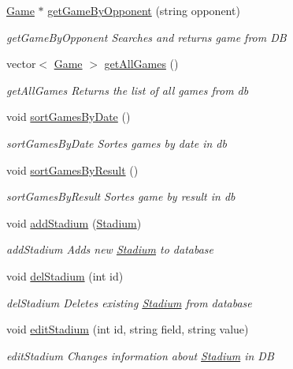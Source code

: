 \begin{DoxyCompactItemize}
\hyperlink{class_game}{Game} $\ast$ \hyperlink{class_data_base_aded9581d3a3a49f2bcef9b85d47df91a}{get\-Game\-By\-Opponent} (string opponent)
\begin{DoxyCompactList}\small\item\em get\-Game\-By\-Opponent Searches and returns game from D\-B \end{DoxyCompactList}\item 
vector$<$ \hyperlink{class_game}{Game} $>$ \hyperlink{class_data_base_aefef256aaad12ee1be50641880fe02f3}{get\-All\-Games} ()
\begin{DoxyCompactList}\small\item\em get\-All\-Games Returns the list of all games from db \end{DoxyCompactList}\item 
void \hyperlink{class_data_base_af298db6d84a93e352aa9915dfbaefd4a}{sort\-Games\-By\-Date} ()
\begin{DoxyCompactList}\small\item\em sort\-Games\-By\-Date Sortes games by date in db \end{DoxyCompactList}\item 
void \hyperlink{class_data_base_a7ded6aadeece170243c9c65cc976704e}{sort\-Games\-By\-Result} ()
\begin{DoxyCompactList}\small\item\em sort\-Games\-By\-Result Sortes game by result in db \end{DoxyCompactList}\item 
void \hyperlink{class_data_base_ab647a42c48cbaaa71446c4c6359c2594}{add\-Stadium} (\hyperlink{class_stadium}{Stadium})
\begin{DoxyCompactList}\small\item\em add\-Stadium Adds new \hyperlink{class_stadium}{Stadium} to database \end{DoxyCompactList}\item 
void \hyperlink{class_data_base_a169759f8c5addb82ce8fbf5c33cfe4ac}{del\-Stadium} (int id)
\begin{DoxyCompactList}\small\item\em del\-Stadium Deletes existing \hyperlink{class_stadium}{Stadium} from database \end{DoxyCompactList}\item 
void \hyperlink{class_data_base_ab245fb2247cf98e0fccfaf90d4f1e665}{edit\-Stadium} (int id, string field, string value)
\begin{DoxyCompactList}\small\item\em edit\-Stadium Changes information about \hyperlink{class_stadium}{Stadium} in D\-B \end{DoxyCompactList}\item 

\end{DoxyCompactItemize}
